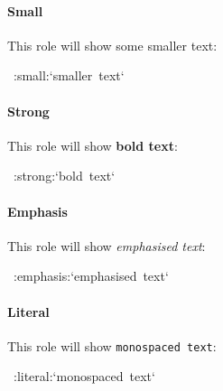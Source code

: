 \documentclass[12pt]{article}
\begin{document}
\hypertarget{lsmall}{}
\paragraph{Small}

This role will show some {\small smaller text}:

\begin{ttfamily}\begin{flushleft}
\mbox{~:small:`smaller~text`}\\
\end{flushleft}\end{ttfamily}

\hypertarget{lstrong}{}
\paragraph{Strong}

This role will show \textbf{bold text}:

\begin{ttfamily}\begin{flushleft}
\mbox{~:strong:`bold~text`}\\
\end{flushleft}\end{ttfamily}

\hypertarget{lemphasis}{}
\paragraph{Emphasis}

This role will show \emph{emphasised text}:

\begin{ttfamily}\begin{flushleft}
\mbox{~:emphasis:`emphasised~text`}\\
\end{flushleft}\end{ttfamily}

\hypertarget{lliteral}{}
\paragraph{Literal}

This role will show \texttt{monospaced text}:

\begin{ttfamily}\begin{flushleft}
\mbox{~:literal:`monospaced~text`}\\
\end{flushleft}\end{ttfamily}
\end{document}
